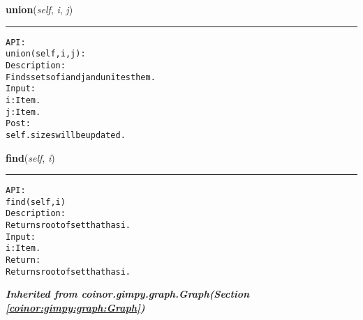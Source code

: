     \vspace{0.5ex}

\hspace{.8\funcindent}\begin{boxedminipage}{\funcwidth}

    \raggedright \textbf{union}(\textit{self}, \textit{i}, \textit{j})

    \vspace{-1.5ex}

    \rule{\textwidth}{0.5\fboxrule}
\setlength{\parskip}{2ex}
\begin{alltt}

API:
    union(self, i, j):
Description:
    Finds sets of i and j and unites them.
Input:
    i: Item.
    j: Item.
Post:
    self.sizes will be updated.
\end{alltt}

\setlength{\parskip}{1ex}
    \end{boxedminipage}

    \label{coinor:gimpy:graph:DisjointSet:find}

    \vspace{0.5ex}

\hspace{.8\funcindent}\begin{boxedminipage}{\funcwidth}

    \raggedright \textbf{find}(\textit{self}, \textit{i})

    \vspace{-1.5ex}

    \rule{\textwidth}{0.5\fboxrule}
\setlength{\parskip}{2ex}
\begin{alltt}

API:
    find(self, i)
Description:
    Returns root of set that has i.
Input:
    i: Item.
Return:
    Returns root of set that has i.
\end{alltt}

\setlength{\parskip}{1ex}
    \end{boxedminipage}


\large{\textbf{\textit{Inherited from coinor.gimpy.graph.Graph\textit{(Section \ref{coinor:gimpy:graph:Graph})}}}}

